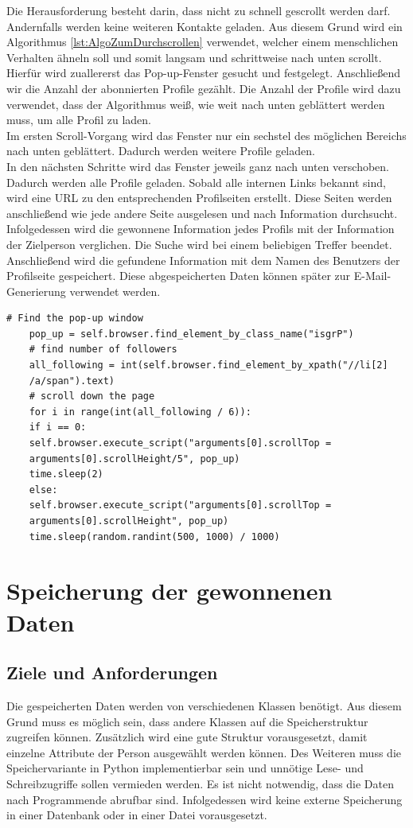 	Die Herausforderung besteht darin, dass nicht zu schnell gescrollt werden darf. Andernfalls werden keine weiteren Kontakte geladen. Aus diesem Grund wird ein Algorithmus \ref{lst:AlgoZumDurchscrollen} verwendet, welcher einem menschlichen Verhalten ähneln soll und somit langsam und schrittweise nach unten scrollt. Hierfür wird zuallererst das Pop-up-Fenster gesucht und festgelegt. Anschließend wir die Anzahl der abonnierten Profile gezählt. Die Anzahl der Profile wird dazu verwendet, dass der Algorithmus weiß, wie weit nach unten geblättert werden muss, um alle Profil zu laden.\\
	Im ersten Scroll-Vorgang wird das Fenster nur ein sechstel des möglichen Bereichs nach unten geblättert. Dadurch werden weitere Profile geladen.\\
	In den nächsten Schritte wird das Fenster jeweils ganz nach unten verschoben. Dadurch werden alle Profile geladen. Sobald alle internen Links bekannt sind, wird eine URL zu den entsprechenden Profilseiten erstellt. Diese Seiten werden anschließend wie jede andere Seite ausgelesen und nach Information durchsucht. Infolgedessen wird die gewonnene Information jedes Profils mit der Information der Zielperson verglichen. Die Suche wird bei einem beliebigen Treffer beendet. Anschließend wird die gefundene Information mit dem Namen des Benutzers der Profilseite gespeichert. Diese abgespeicherten Daten können später zur E-Mail-Generierung verwendet werden.\\
	
	\begin{lstlisting}[caption=Algorithmus zum Herunterscrollen des Pop-up Fensters,label={lst:AlgoZumDurchscrollen}]
	# Find the pop-up window
	pop_up = self.browser.find_element_by_class_name("isgrP")        
	# find number of followers
	all_following = int(self.browser.find_element_by_xpath("//li[2]
	/a/span").text)
	# scroll down the page
	for i in range(int(all_following / 6)):
	if i == 0:
	self.browser.execute_script("arguments[0].scrollTop = 
	arguments[0].scrollHeight/5", pop_up)
	time.sleep(2)
	else:
	self.browser.execute_script("arguments[0].scrollTop = 
	arguments[0].scrollHeight", pop_up)
	time.sleep(random.randint(500, 1000) / 1000)
	\end{lstlisting}	

\section{Speicherung der gewonnenen Daten}
	\subsection{Ziele und Anforderungen}
	Die gespeicherten Daten werden von verschiedenen Klassen benötigt. Aus diesem Grund muss es möglich sein, dass andere Klassen auf die Speicherstruktur zugreifen können. Zusätzlich wird eine gute Struktur vorausgesetzt, damit einzelne Attribute der Person ausgewählt werden können. Des Weiteren muss die Speichervariante in Python implementierbar sein und unnötige Lese- und Schreibzugriffe sollen vermieden werden. Es ist nicht notwendig, dass die Daten nach Programmende abrufbar sind. Infolgedessen wird keine externe Speicherung in einer Datenbank oder in einer Datei vorausgesetzt.
